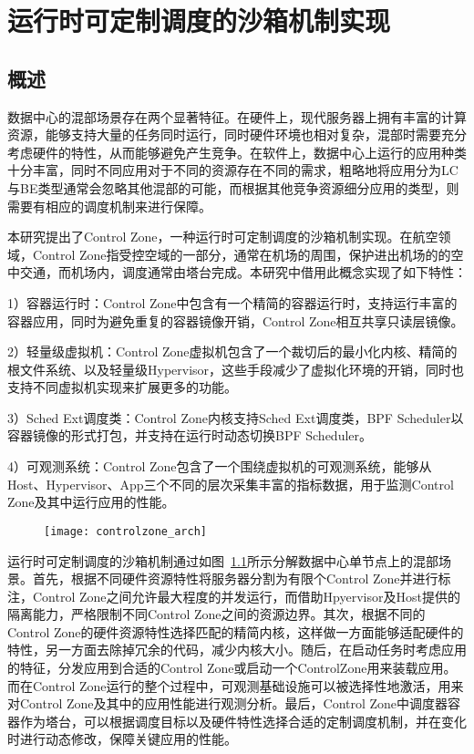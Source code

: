 \chapter{运行时可定制调度的沙箱机制实现}\label{chap:control_zone}

\section{概述}


数据中心的混部场景存在两个显著特征。在硬件上，现代服务器上拥有丰富的计算资源，能够支持大量的任务同时运行，同时硬件环境也相对复杂，混部时需要充分考虑硬件的特性，从而能够避免产生竞争。在软件上，数据中心上运行的应用种类十分丰富，同时不同应用对于不同的资源存在不同的需求，粗略地将应用分为LC与BE类型通常会忽略其他混部的可能，而根据其他竞争资源细分应用的类型，则需要有相应的调度机制来进行保障。

本研究提出了Control Zone，一种运行时可定制调度的沙箱机制实现。在航空领域，Control Zone指受控空域的一部分，通常在机场的周围，保护进出机场的的空中交通，而机场内，调度通常由塔台完成。本研究中借用此概念实现了如下特性：

1）容器运行时：Control Zone中包含有一个精简的容器运行时，支持运行丰富的容器应用，同时为避免重复的容器镜像开销，Control Zone相互共享只读层镜像。

2）轻量级虚拟机：Control Zone虚拟机包含了一个裁切后的最小化内核、精简的根文件系统、以及轻量级Hypervisor，这些手段减少了虚拟化环境的开销，同时也支持不同虚拟机实现来扩展更多的功能。

3）Sched Ext调度类：Control Zone内核支持Sched Ext调度类，BPF Scheduler以容器镜像的形式打包，并支持在运行时动态切换BPF Scheduler。

4）可观测系统：Control Zone包含了一个围绕虚拟机的可观测系统，能够从Host、Hypervisor、App三个不同的层次采集丰富的指标数据，用于监测Control Zone及其中运行应用的性能。

\begin{figure}[!htbp]
    \centering
    \texttt{[image: controlzone\_arch]}
    \label{fig:controlzone_arch}
\end{figure}
 
运行时可定制调度的沙箱机制通过如图~\ref{fig:controlzone_arch}所示分解数据中心单节点上的混部场景。首先，根据不同硬件资源特性将服务器分割为有限个Control Zone并进行标注，Control Zone之间允许最大程度的并发运行，而借助Hpyervisor及Host提供的隔离能力，严格限制不同Control Zone之间的资源边界。其次，根据不同的Control Zone的硬件资源特性选择匹配的精简内核，这样做一方面能够适配硬件的特性，另一方面去除掉冗余的代码，减少内核大小。随后，在启动任务时考虑应用的特征，分发应用到合适的Control Zone或启动一个ControlZone用来装载应用。而在Control Zone运行的整个过程中，可观测基础设施可以被选择性地激活，用来对Control Zone及其中的应用性能进行观测分析。最后，Control Zone中调度器容器作为塔台，可以根据调度目标以及硬件特性选择合适的定制调度机制，并在变化时进行动态修改，保障关键应用的性能。

